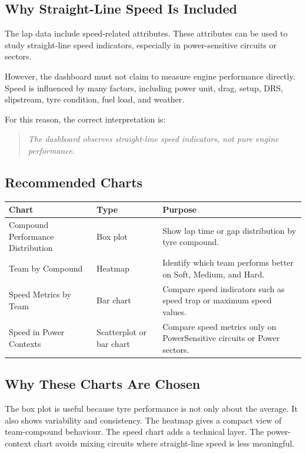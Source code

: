 \documentclass[12pt,a4paper]{article}
\begin{document}
	\subsection{Why Straight-Line Speed Is Included}
	
	The lap data include speed-related attributes.
	These attributes can be used to study straight-line speed indicators, especially in power-sensitive circuits or sectors.
	
	However, the dashboard must not claim to measure engine performance directly.
	Speed is influenced by many factors, including power unit, drag, setup, DRS, slipstream, tyre condition, fuel load, and weather.
	
	For this reason, the correct interpretation is:
	
	\begin{quote}
		\textit{The dashboard observes straight-line speed indicators, not pure engine performance.}
	\end{quote}
	
	\subsection{Recommended Charts}
	
	\begin{longtable}{p{4cm} p{4cm} p{6cm}}
		\toprule
		\textbf{Chart} & \textbf{Type} & \textbf{Purpose} \\
		\midrule
		Compound Performance Distribution & Box plot & Show lap time or gap distribution by tyre compound. \\
		Team by Compound & Heatmap & Identify which team performs better on Soft, Medium, and Hard. \\
		Speed Metrics by Team & Bar chart & Compare speed indicators such as speed trap or maximum speed values. \\
		Speed in Power Contexts & Scatterplot or bar chart & Compare speed metrics only on PowerSensitive circuits or Power sectors. \\
		\bottomrule
	\end{longtable}
	
	\subsection{Why These Charts Are Chosen}
	
	The box plot is useful because tyre performance is not only about the average.
	It also shows variability and consistency.
	The heatmap gives a compact view of team-compound behaviour.
	The speed chart adds a technical layer.
	The power-context chart avoids mixing circuits where straight-line speed is less meaningful.
	
\end{document}
